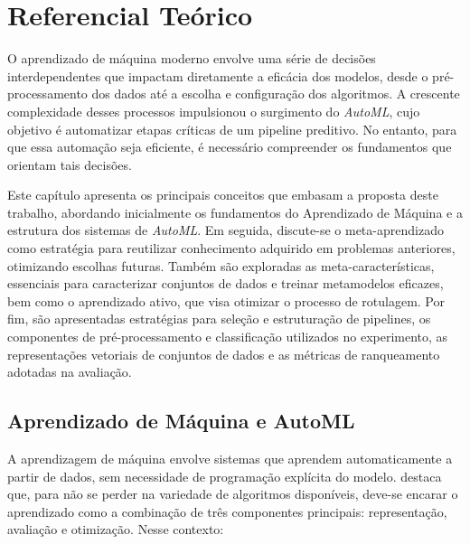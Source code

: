 \chapter{Referencial Teórico}\label{cap:referencialTeorico}

O aprendizado de máquina moderno envolve uma série de decisões interdependentes que impactam diretamente a eficácia dos modelos, desde o pré-processamento dos dados até a escolha e configuração dos algoritmos. A crescente complexidade desses processos impulsionou o surgimento do \textit{AutoML}, cujo objetivo é automatizar etapas críticas de um pipeline preditivo. No entanto, para que essa automação seja eficiente, é necessário compreender os fundamentos que orientam tais decisões.

Este capítulo apresenta os principais conceitos que embasam a proposta deste trabalho, abordando inicialmente os fundamentos do Aprendizado de Máquina e a estrutura dos sistemas de \textit{AutoML}. Em seguida, discute-se o meta-aprendizado como estratégia para reutilizar conhecimento adquirido em problemas anteriores, otimizando escolhas futuras. Também são exploradas as meta-características, essenciais para caracterizar conjuntos de dados e treinar metamodelos eficazes, bem como o aprendizado ativo, que visa otimizar o processo de rotulagem. Por fim, são apresentadas estratégias para seleção e estruturação de pipelines, os componentes de pré-processamento e classificação utilizados no experimento, as representações vetoriais de conjuntos de dados e as métricas de ranqueamento adotadas na avaliação.


\section{Aprendizado de Máquina e AutoML}
A aprendizagem de máquina envolve sistemas que aprendem automaticamente a partir de dados, sem necessidade de programação explícita do modelo.  destaca que, para não se perder na variedade de algoritmos disponíveis, deve-se encarar o aprendizado como a combinação de três componentes principais: representação, avaliação e otimização. Nesse contexto:

